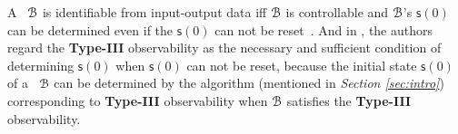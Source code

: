 
A \BCN\ ${\mathcal{B}}$ is identifiable from input-output data iff ${\mathcal{B}}$ is controllable and ${\mathcal{B}}$'s $\mathsf{s}(0)$ can be determined even if the $\mathsf{s}(0)$ can not be reset~\cite{Cheng2011Identification}. And in \cite{Cheng2011Identification}, the authors regard the {\bf Type-III} observability as the necessary and sufficient condition of determining $\mathsf{s}(0)$ when $\mathsf{s}(0)$ can not be reset, because the initial state $\mathsf{s}(0)$ of a \BCN\ ${\mathcal{B}}$ can be determined by the algorithm (mentioned in {\em Section \ref{sec:intro}}) corresponding to {\bf Type-III} observability when ${\mathcal{B}}$ satisfies the {\bf Type-III} observability.


   

